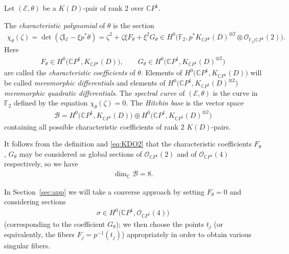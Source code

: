 \documentclass[pdftex]{sigma}
\newcommand{\C}{{\mathbb C}} %
\renewcommand{\O}{{\mathcal O}} %
\newcommand{\CP}[1]{\mathbb{C}P^{#1}} %
\newcommand{\E}{{\mathcal E}} %
\numberwithin{equation}{section}
\begin{document}
Let $(\E, \theta)$ be a $K(D)$-pair of rank $2$ over $\CP1$.
\begin{defn}
The {\it characteristic polynomial} of $\theta$ is the section
\begin{gather}\label{eq:char-poly1}
 \chi_{\theta} (\zeta ) = \det (\zeta \mbox{I}_{\E} - \xi p^* \theta) = \zeta^2 + \zeta \xi F_{\theta} + \xi^2 G_{\theta} \in H^0 \big({\mathbb {F}}_2 ,p^* K_{\CP1}(D)^{\otimes 2} \otimes \O_{{\mathbb {F}}_2 | \CP1}(2) \big).\!\!\!
\end{gather}
Here
 \begin{gather*}
 F_{\theta}\in H^0\big(\CP1 , K_{\CP1}(D) \big), \qquad G_{\theta} \in H^0\big(\CP1 , K_{\CP1}(D)^{\otimes 2} \big)
 \end{gather*}
 are called the {\it characteristic coefficients} of $\theta$. Elements of $H^0\big(\CP1 , K_{\CP1}(D)\big)$ will be called {\it meromorphic differentials} and
 elements of $H^0\big(\CP1 , K_{\CP1}(D)^{\otimes 2}\big)$ {\it meromorphic quadratic dif\-fe\-rentials}.
 The {\it spectral curve} of $(\E , \theta )$ is the curve in ${\mathbb {F}}_2$ defined by the equation $\chi_{\theta} (\zeta ) = 0$.
 The {\it Hitchin base} is the vector space
 \begin{gather*}
 \mathcal{B} = H^0\big(\CP1 , K_{\CP1}(D) \big) \oplus H^0\big(\CP1 , K_{\CP1}(D)^{\otimes 2} \big)
 \end{gather*}
 containing all possible characteristic coefficients of rank $2$ $K(D)$-pairs.
\end{defn}
It follows from the definition and \eqref{eq:KDO2} that the
characteristic coefficients $F_{\theta}$, $G_{\theta}$ may be considered
as global sections of $\O_{\CP1}(2)$ and of $\O_{\CP1}(4)$ respectively, so we have
\begin{gather*}
 \dim_{\C} \mathcal{B} = 8.
\end{gather*}
\begin{Remark}
In Section~\ref{sec:app} we will take a converse approach by setting $F_{\theta} = 0$ and considering sections
\begin{gather*}
 \sigma \in H^0 \big(\CP1 , \O_{\CP1} (4) \big)
\end{gather*}
(corresponding to the coefficient $G_{\theta}$); we then choose the points $t_j$ (or equivalently, the fibers $F_j = p^{-1}(t_j)$) appropriately in order to obtain various singular fibers.
\end{Remark}
\end{document}
